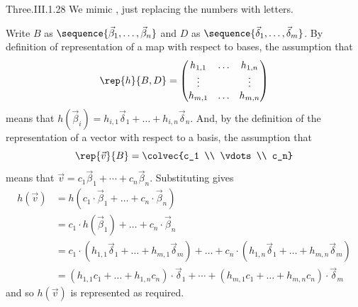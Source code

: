 \begin{ans}{Three.III.1.28}
      We mimic , just replacing the
      numbers with letters.

      Write \( B \) as \( \sequence{\vec{\beta}_1,\ldots,\vec{\beta}_n} \)
      and  \( D \) as \( \sequence{\vec{\delta}_1,\dots,\vec{\delta}_m} \).
      By definition of representation of a map with respect to bases,
      the assumption that
      \begin{equation*}
        \rep{h}{B,D}
        =\begin{pmatrix}
           h_{1,1} &\ldots  &h_{1,n}  \\
           \vdots  &        &\vdots   \\
           h_{m,1} &\ldots  &h_{m,n}
         \end{pmatrix}
      \end{equation*}
      means that
      $h(\vec{\beta}_i)=h_{i,1}\vec{\delta}_1+\dots+h_{i,n}\vec{\delta}_n$.
      And, by the definition of the representation of a vector with respect to
      a basis, the assumption that
      \begin{equation*}
        \rep{\vec{v}}{B}=\colvec{c_1 \\ \vdots \\ c_n}
      \end{equation*}
      means that \( \vec{v}=c_1\vec{\beta}_1+\cdots+c_n\vec{\beta}_n \).
      Substituting gives
      \begin{align*}
        h(\vec{v})
        &=h(c_1\cdot\vec{\beta}_1+\dots+c_n\cdot\vec{\beta}_n)      \\
        &=c_1\cdot h(\vec{\beta}_1)+\dots+c_n\cdot \vec{\beta}_n    \\
        &=c_1\cdot (h_{1,1}\vec{\delta}_1+\dots+h_{m,1}\vec{\delta}_m)
        +\dots
        +c_n\cdot (h_{1,n}\vec{\delta}_1+\dots+h_{m,n}\vec{\delta}_m) \\
        &=(h_{1,1}c_1+\dots+h_{1,n}c_n)\cdot\vec{\delta}_1
        +\cdots
        +(h_{m,1}c_1+\dots+h_{m,n}c_n)\cdot\vec{\delta}_m
      \end{align*}
      and so $h(\vec{v})$ is represented as required.
    
\end{ans}
